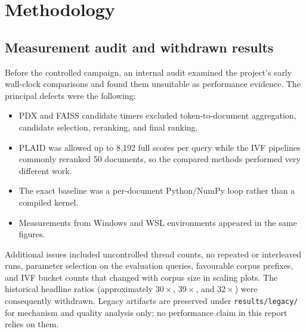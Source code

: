 \section{Methodology}
\label{sec:methodology}

\subsection{Measurement audit and withdrawn results}
\label{sec:audit}


Before the controlled campaign, an internal audit examined the project's early 
wall-clock comparisons and found them unsuitable as performance evidence. The 
principal defects were the following:
\begin{itemize}[noitemsep]
  \item PDX and FAISS candidate timers excluded token-to-document aggregation, 
  candidate selection, reranking, and final ranking.
  \item PLAID was allowed up to 8,192 full scores per query while the IVF 
  pipelines commonly reranked 50 documents, so the compared methods performed 
  very different work.
  \item The exact baseline was a per-document Python/NumPy loop rather than 
  a compiled kernel.
  \item Measurements from Windows and WSL environments appeared in the same figures.
\end{itemize}
Additional issues included uncontrolled thread counts, no repeated or interleaved 
runs, parameter selection on the evaluation queries, favourable corpus prefixes, 
and IVF bucket counts that changed with corpus size in scaling plots. The historical 
headline ratios (approximately $30\times$, $39\times$, and $32\times$) were 
consequently withdrawn. Legacy artifacts are preserved under \texttt{results/legacy/} 
for mechanism and quality analysis only; no performance claim in this report relies 
on them.

